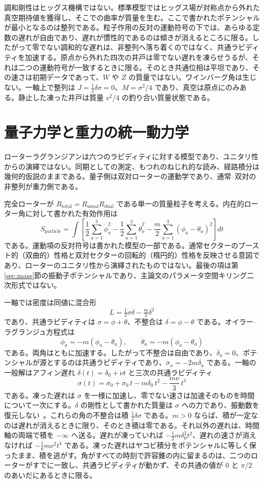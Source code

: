 \documentclass[a4paper]{article}
\begin{document}
調和剛性はヒッグス機構ではない。標準模型ではヒッグス場が対称点から外れた真空期待値を獲得し、そこでの曲率が質量を生む。ここで書かれたポテンシャルが最小となるのは整列である。粒子作用の反対の運動符号の下では、あらゆる定数の遅れが自由であり、遅れが慣性的であるのは傾きが消えるところに限る。したがって零でない調和的な遅れは、非整列へ落ち着くのではなく、共通ラピディティを加速する。原点から外れた四次の井戸は零でない遅れを凍らせうるが、それは二つの運動符号が一致するときに限る。そのとき共通位相は平坦であり、その速さは初期データであって、\(W\) や \(Z\) の質量ではない。ワインバーグ角は生じない。一軸上で整列は \(J=\frac12\delta\sigma=0\)、\(M=\sigma^2/4\) であり、真空は原点にのみある。静止した凍った井戸は質量 \(v^2/4\) の釣り合い質量状態である。

\section{量子力学と重力の統一動力学}
\label{sec:dynamics}

ローターラグランジアンは六つのラピディティに対する模型であり、ユニタリ性からの演繹ではない。同期としての測定、もつれのねじれ的な読み、経路積分は幾何的仮説のままである。量子側は双対ローターの運動学であり、通常--双対の非整列が重力側である。

完全ローターが $R_\text{total} = R_\text{usual} R_\text{dual}$ である単一の質量粒子を考える。内在的ローター角に対して書かれた有効作用は
\[
S_\text{particle} = \int \left[ \frac{1}{2} \sum_{a=1}^3 \dot{\phi}_a^2 - \frac{1}{2} \sum_{a=1}^3 \dot{\theta}_a^2 - \frac{m}{2} \sum_{a=1}^3 (\phi_a - \theta_a)^2 \right] dt
\]
である。運動項の反対符号は書かれた模型の一部である。通常セクターのブースト的（双曲的）性格と双対セクターの回転的（楕円的）性格を反映させる意図であり、ローターのユニタリ性から演繹されたものではない。最後の項は第\ref{sec:mass}節の振動子ポテンシャルであり、主論文のパラメータ空間キリング二次形式ではない。

一軸では密度は同値に混合形
\[
L=\tfrac12\dot\sigma\dot\delta-\tfrac m2\delta^2
\]
であり、共通ラピディティは $\sigma=\phi+\theta$、不整合は $\delta=\phi-\theta$ である。オイラー--ラグランジュ方程式は
\[
\ddot{\phi}_a = -m (\phi_a - \theta_a), \qquad \ddot{\theta}_a = -m (\phi_a - \theta_a)
\]
である。両角はともに加速する。したがって不整合は自由であり、$\ddot\delta_a=0$、ポテンシャルが源とするのは共通ラピディティであり、$\ddot\sigma_a=-2m\delta_a$ である。一軸の一般解はアフィン遅れ $\delta(t)=\delta_0+\nu t$ と三次の共通ラピディティ
\[
\sigma(t)=\sigma_0+\dot\sigma_0\,t-m\delta_0\,t^2-\frac{m\nu}{3}\,t^3
\]
である。凍った遅れは $\sigma$ を一様に加速し、零でない速さは加速そのものを時間について一次にする。$\delta$ の剛性として書かれた質量は $\sigma$ への力であり、振動数を復元しない~\cite{dst-dynamic-equation}。これらの角の不整合は積 $\tfrac12\delta\sigma$ である。$m>0$ ならば、積が一定なのは遅れが消えるときに限り、そのとき積は零である。それ以外の遅れは、時間軸の両端で積を $-\infty$ へ送る。遅れが凍っていれば $-\tfrac12 m\delta_0^2 t^2$、遅れの速さが消えなければ $-\tfrac16 m\nu^2 t^4$ である。凍った遅れはヤコビ積分をポテンシャルに等しく保ったまま、積を逃がす。角がすべての時刻で許容錐の内に留まるのは、二つのローターがすでに一致し、共通ラピディティが動かず、その共通の値が $0$ と $\pi/2$ のあいだにあるときに限る。
\end{document}
